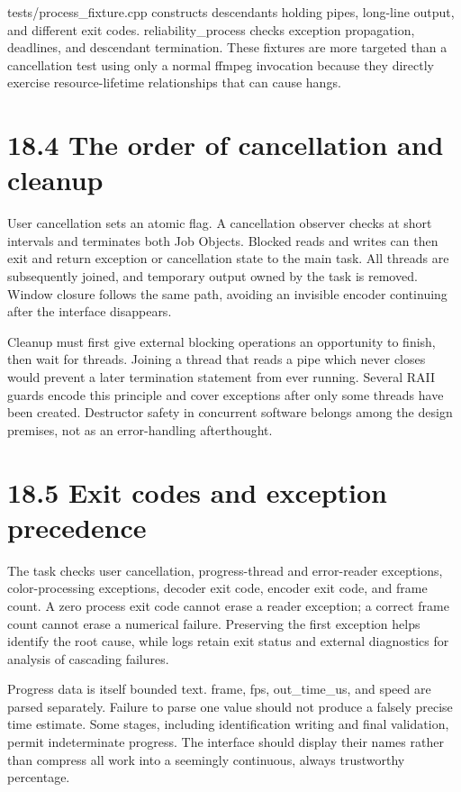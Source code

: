 \documentclass[11pt,a4paper,openany]{book}
\begin{document}
tests/process\_fixture.cpp constructs descendants holding pipes, long-line output, and different exit codes. reliability\_process checks exception propagation, deadlines, and descendant termination. These fixtures are more targeted than a cancellation test using only a normal ffmpeg invocation because they directly exercise resource-lifetime relationships that can cause hangs.


\section*{18.4 The order of cancellation and cleanup}
User cancellation sets an atomic flag. A cancellation observer checks at short intervals and terminates both Job Objects. Blocked reads and writes can then exit and return exception or cancellation state to the main task. All threads are subsequently joined, and temporary output owned by the task is removed. Window closure follows the same path, avoiding an invisible encoder continuing after the interface disappears.

Cleanup must first give external blocking operations an opportunity to finish, then wait for threads. Joining a thread that reads a pipe which never closes would prevent a later termination statement from ever running. Several RAII guards encode this principle and cover exceptions after only some threads have been created. Destructor safety in concurrent software belongs among the design premises, not as an error-handling afterthought.


\section*{18.5 Exit codes and exception precedence}
The task checks user cancellation, progress-thread and error-reader exceptions, color-processing exceptions, decoder exit code, encoder exit code, and frame count. A zero process exit code cannot erase a reader exception; a correct frame count cannot erase a numerical failure. Preserving the first exception helps identify the root cause, while logs retain exit status and external diagnostics for analysis of cascading failures.

Progress data is itself bounded text. frame, fps, out\_time\_us, and speed are parsed separately. Failure to parse one value should not produce a falsely precise time estimate. Some stages, including identification writing and final validation, permit indeterminate progress. The interface should display their names rather than compress all work into a seemingly continuous, always trustworthy percentage.
\end{document}
